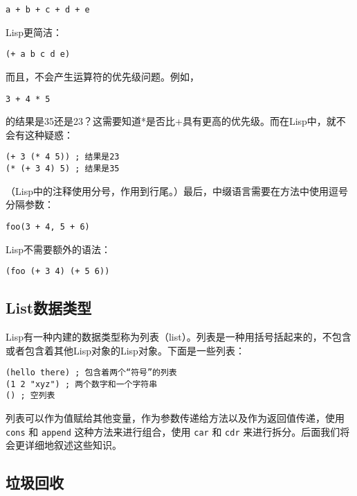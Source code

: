 \begin{verbatim}
a + b + c + d + e
\end{verbatim}

Lisp更简洁：

\begin{verbatim}
(+ a b c d e)
\end{verbatim}

而且，不会产生运算符的优先级问题。例如，

\begin{verbatim}
3 + 4 * 5
\end{verbatim}

的结果是35还是23？这需要知道*是否比+具有更高的优先级。而在Lisp中，就不会有这种疑惑：

\begin{verbatim}
(+ 3 (* 4 5)) ; 结果是23
(* (+ 3 4) 5) ; 结果是35
\end{verbatim}

（Lisp中的注释使用分号，作用到行尾。）最后，中缀语言需要在方法中使用逗号分隔参数：

\begin{verbatim}
foo(3 + 4, 5 + 6)
\end{verbatim}

Lisp不需要额外的语法：

\begin{verbatim}
(foo (+ 3 4) (+ 5 6))
\end{verbatim}

\subsection{List数据类型}
\label{section:01-List-data-type}

Lisp有一种内建的数据类型称为列表（list）。列表是一种用括号括起来的，不包含或者包含着其他Lisp对象的Lisp对象。下面是一些列表：

\begin{verbatim}
(hello there) ; 包含着两个“符号”的列表
(1 2 "xyz") ; 两个数字和一个字符串
() ; 空列表
\end{verbatim}

列表可以作为值赋给其他变量，作为参数传递给方法以及作为返回值传递，使用 \texttt{cons} 和 \texttt{append} 这种方法来进行组合，使用 \texttt{car} 和 \texttt{cdr} 来进行拆分。后面我们将会更详细地叙述这些知识。

\subsection{垃圾回收}
\label{section:01-Garbage-collection}

